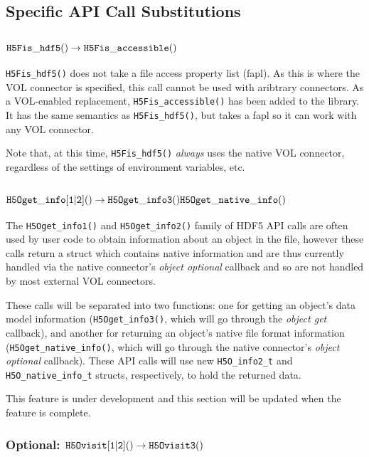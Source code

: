 \subsection{Specific API Call Substitutions}
\subsubsection{${\tt H5Fis\_hdf5()} \rightarrow {\tt H5Fis\_accessible()}$}

{\tt H5Fis\_hdf5()} does not take a file access property list (fapl). As this is where the VOL connector is specified, this call cannot be used with aribtrary connectors. As a VOL-enabled replacement, {\tt H5Fis\_accessible()} has been added to the library. It has the same semantics as {\tt H5Fis\_hdf5()}, but takes a fapl so it can work with any VOL connector.

Note that, at this time, {\tt H5Fis\_hdf5()} \textit{always} uses the native VOL connector, regardless of the settings of environment variables, etc.

\subsubsection{${\tt H5Oget\_info[1|2]()} \rightarrow {\tt H5Oget\_info3()} {\tt H5Oget\_native\_info()}$}

\thgfuturewarning

The {\tt H5Oget\_info1()} and {\tt H5Oget\_info2()} family of HDF5 API calls are often used by user code to obtain information about an object in the file, however these calls return a struct which contains native information and are thus currently handled via the native connector's \textit{object optional} callback and so are not handled by most external VOL connectors.

These calls will be separated into two functions: one for getting an object's data model information ({\tt H5Oget\_info3()}, which will go through the \textit{object get} callback), and another for returning an object's native file format information ({\tt H5Oget\_native\_info()}, which will go through the native connector's \textit{object optional} callback). These API calls will use new {\tt H5O\_info2\_t} and {\tt H5O\_native\_info\_t} structs, respectively, to hold the returned data.

This feature is under development and this section will be updated when the feature is complete.


\subsubsection{Optional: ${\tt H5Ovisit[1|2]()} \rightarrow {\tt H5Ovisit3()}$}

